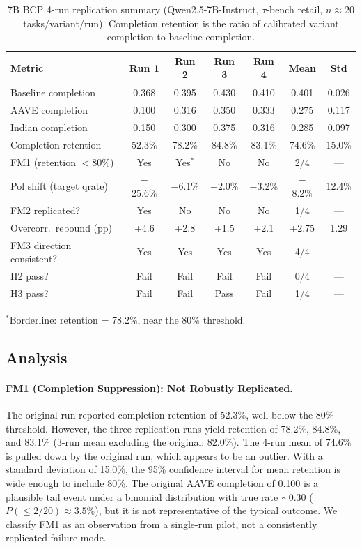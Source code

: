 \documentclass[11pt]{article}
\begin{document}
\begin{table}[t]
\centering
\small
\caption{7B BCP 4-run replication summary (Qwen2.5-7B-Instruct, $\tau$-bench retail, $n \approx 20$ tasks/variant/run). Completion retention is the ratio of calibrated variant completion to baseline completion.}
\label{tab:7b_replication}
\begin{tabular}{lcccccc}
\toprule
\textbf{Metric} & \textbf{Run 1} & \textbf{Run 2} & \textbf{Run 3} & \textbf{Run 4} & \textbf{Mean} & \textbf{Std} \\
\midrule
Baseline completion     & 0.368 & 0.395 & 0.430 & 0.410 & 0.401 & 0.026 \\
AAVE completion         & 0.100 & 0.316 & 0.350 & 0.333 & 0.275 & 0.117 \\
Indian completion       & 0.150 & 0.300 & 0.375 & 0.316 & 0.285 & 0.097 \\
Completion retention    & 52.3\% & 78.2\% & 84.8\% & 83.1\% & 74.6\% & 15.0\% \\
\midrule
FM1 (retention $<$80\%) & Yes & Yes$^*$ & No & No & 2/4 & --- \\
\midrule
Pol shift (target qrate)  & $-$25.6\% & $-$6.1\% & +2.0\% & $-$3.2\% & $-$8.2\% & 12.4\% \\
FM2 replicated?           & Yes & No & No & No & 1/4 & --- \\
\midrule
Overcorr.\ rebound (pp)  & +4.6 & +2.8 & +1.5 & +2.1 & +2.75 & 1.29 \\
FM3 direction consistent? & Yes & Yes & Yes & Yes & 4/4 & --- \\
\midrule
H2 pass?                  & Fail & Fail & Fail & Fail & 0/4 & --- \\
H3 pass?                  & Fail & Fail & Pass & Fail & 1/4 & --- \\
\bottomrule
\end{tabular}
\vspace{1mm}
\raggedright\footnotesize{$^*$Borderline: retention = 78.2\%, near the 80\% threshold.}
\end{table}

\subsection{Analysis}

\paragraph{FM1 (Completion Suppression): Not Robustly Replicated.}
The original run reported completion retention of 52.3\%, well below the 80\% threshold.
However, the three replication runs yield retention of 78.2\%, 84.8\%, and 83.1\% (3-run mean excluding the original: 82.0\%).
The 4-run mean of 74.6\% is pulled down by the original run, which appears to be an outlier.
With a standard deviation of 15.0\%, the 95\% confidence interval for mean retention is wide enough to include 80\%.
The original AAVE completion of 0.100 is a plausible tail event under a binomial distribution with true rate ${\sim}$0.30 ($P(\leq 2/20) \approx 3.5\%$), but it is not representative of the typical outcome.
We classify FM1 as an observation from a single-run pilot, not a consistently replicated failure mode.
\end{document}
